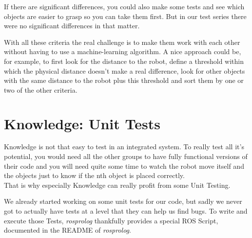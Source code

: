\documentclass[main.tex]{subfiles}
\begin{document}
		If there are significant differences, you could also make some tests and see which objects are easier to grasp so you can take them first. But in our test series there were no significant differences in that matter. 
		
		With all these criteria the real challenge is to make them work with each other without having to use a machine-learning algorithm. A nice approach could be, for example, to first look for the distance to the robot, define a threshold within which the physical distance doesn't make a real difference, look for other objects with the same distance to the robot plus this threshold and sort them by one or two of the other criteria. 
		
		\section{Knowledge: Unit Tests}
		Knowledge is not that easy to test in an integrated system. To really test all it's potential, you would need all the other groups to have fully functional versions of their code and you will need quite some time to watch the robot move itself and the objects just to know if the nth object is placed correctly.\\
		That is why especially Knowledge can really profit from some Unit Testing.
		
		We already started working on some unit tests for our code, but sadly we never got to actually have tests at a level that they can help us find bugs. To write and execute those Tests, \textit{rosprolog} thankfully provides a special ROS Script, documented in the README of \textit{rosprolog}.


		
\end{document}
